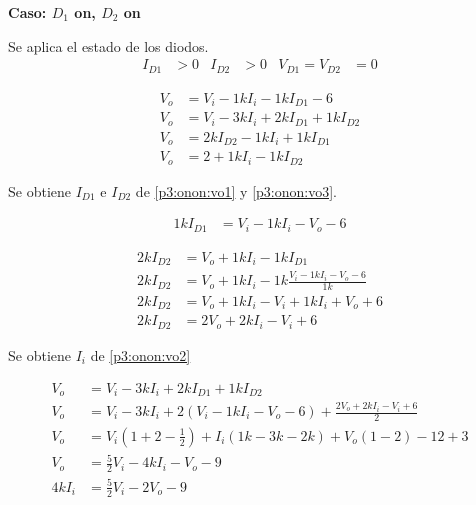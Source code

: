 %
%
%

\textbf{Caso: $D_1$ on, $D_2$ on}

Se aplica el estado de los diodos.
\begin{align*}
  I_{D1} &> 0
  &
  I_{D2} &> 0
  &
  V_{D1} = V_{D2} &= 0
\end{align*}

\begin{align}
  V_o &= V_i - 1k I_i - 1k I_{D1} - 6 \label{p3:onon:vo1}
  \\
  V_o &= V_i - 3k I_i + 2k I_{D1} + 1k I_{D2} \label{p3:onon:vo2}
  \\
  V_o &= 2k I_{D2} - 1k I_i + 1k I_{D1} \label{p3:onon:vo3}
  \\
  V_o &= 2 + 1k I_i - 1k I_{D2} \label{p3:onon:vo4}
\end{align}

Se obtiene $I_{D1}$ e $I_{D2}$ de \ref{p3:onon:vo1} y \ref{p3:onon:vo3}.

\begin{align*}
  1k I_{D1} &= V_i - 1k I_i - V_o - 6
\end{align*}

\begin{align*}
  2k I_{D2} &= V_o + 1k I_i - 1k I_{D1}
  \\
  2k I_{D2} &= V_o + 1k I_i - 1k \frac{V_i - 1k I_i - V_o - 6}{1k}
  \\
  2k I_{D2} &= V_o + 1k I_i - V_i + 1k I_i + V_o + 6
  \\
  2k I_{D2} &= 2 V_o + 2k I_i - V_i + 6
  \end{align*}

Se obtiene $I_i$ de \ref{p3:onon:vo2}

\begin{align*}
  V_o &= V_i - 3k I_i + 2k I_{D1} + 1k I_{D2}
  \\
  V_o &= V_i - 3k I_i +
    2 \left(V_i - 1k I_i - V_o - 6\right) +
    \frac{2 V_o + 2k I_i - V_i + 6}{2}
  \\
  V_o &= V_i \left(1+2-\frac{1}{2}\right) +
    I_i \left(1k-3k-2k\right) +
    V_o \left(1-2\right)
    -12 + 3
  \\
  V_o &= \frac{5}{2} V_i - 4k I_i - V_o - 9
  \\
  4k I_i &= {\frac{5}{2} V_i - 2 V_o - 9}
\end{align*}

